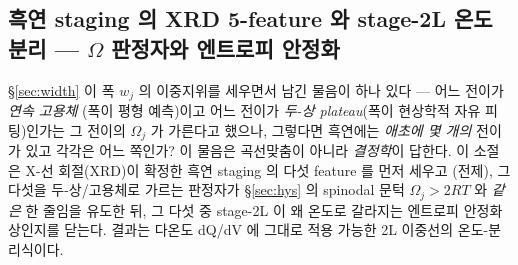 \subsection{흑연 staging 의 XRD 5-feature 와 stage-2L 온도 분리 --- $\Omega$ 판정자와 엔트로피 안정화}\label{ssec:gr-2L}
\S\ref{sec:width} 이 폭 $w_j$ 의 이중지위를 세우면서 남긴 물음이 하나 있다 --- 어느 전이가 \emph{연속 고용체}
(폭이 평형 예측)이고 어느 전이가 \emph{두-상 plateau}(폭이 현상학적 자유 피팅)인가는 그 전이의 $\Omega_j$ 가
가른다고 했으나, 그렇다면 흑연에는 \emph{애초에 몇 개의} 전이가 있고 각각은 어느 쪽인가? 이 물음은 곡선맞춤이
아니라 \emph{결정학}이 답한다. 이 소절은 X-선 회절(XRD)이 확정한 흑연 staging 의 다섯 feature 를 먼저 세우고
(전제), 그 다섯을 두-상/고용체로 가르는 판정자가 \S\ref{sec:hys} 의 spinodal 문턱 $\Omega_j>2RT$ 와 \emph{같은}
한 줄임을 유도한 뒤, 그 다섯 중 stage-2L 이 왜 온도로 갈라지는 엔트로피 안정화 상인지를 닫는다. 결과는 다온도
dQ/dV 에 그대로 적용 가능한 2L 이중선의 온도-분리식이다.

